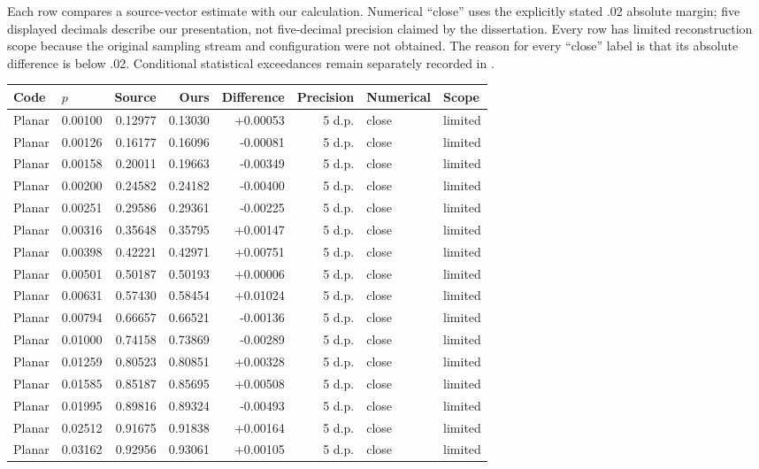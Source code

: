 Each row compares a source-vector estimate with our calculation. Numerical ``close'' uses the explicitly stated .02 absolute margin; five displayed decimals describe our presentation, not five-decimal precision claimed by the dissertation. Every row has limited reconstruction scope because the original sampling stream and configuration were not obtained. The reason for every ``close'' label is that its absolute difference is below .02. Conditional statistical exceedances remain separately recorded in .
\begin{longtable}{llrrrrll}
\toprule Code & $p$ & Source & Ours & Difference & Precision & Numerical & Scope\\\midrule
\endhead
Planar & 0.00100 & 0.12977 & 0.13030 & +0.00053 & 5 d.p. & close & limited \\
Planar & 0.00126 & 0.16177 & 0.16096 & -0.00081 & 5 d.p. & close & limited \\
Planar & 0.00158 & 0.20011 & 0.19663 & -0.00349 & 5 d.p. & close & limited \\
Planar & 0.00200 & 0.24582 & 0.24182 & -0.00400 & 5 d.p. & close & limited \\
Planar & 0.00251 & 0.29586 & 0.29361 & -0.00225 & 5 d.p. & close & limited \\
Planar & 0.00316 & 0.35648 & 0.35795 & +0.00147 & 5 d.p. & close & limited \\
Planar & 0.00398 & 0.42221 & 0.42971 & +0.00751 & 5 d.p. & close & limited \\
Planar & 0.00501 & 0.50187 & 0.50193 & +0.00006 & 5 d.p. & close & limited \\
Planar & 0.00631 & 0.57430 & 0.58454 & +0.01024 & 5 d.p. & close & limited \\
Planar & 0.00794 & 0.66657 & 0.66521 & -0.00136 & 5 d.p. & close & limited \\
Planar & 0.01000 & 0.74158 & 0.73869 & -0.00289 & 5 d.p. & close & limited \\
Planar & 0.01259 & 0.80523 & 0.80851 & +0.00328 & 5 d.p. & close & limited \\
Planar & 0.01585 & 0.85187 & 0.85695 & +0.00508 & 5 d.p. & close & limited \\
Planar & 0.01995 & 0.89816 & 0.89324 & -0.00493 & 5 d.p. & close & limited \\
Planar & 0.02512 & 0.91675 & 0.91838 & +0.00164 & 5 d.p. & close & limited \\
Planar & 0.03162 & 0.92956 & 0.93061 & +0.00105 & 5 d.p. & close & limited \\

\end{longtable}
